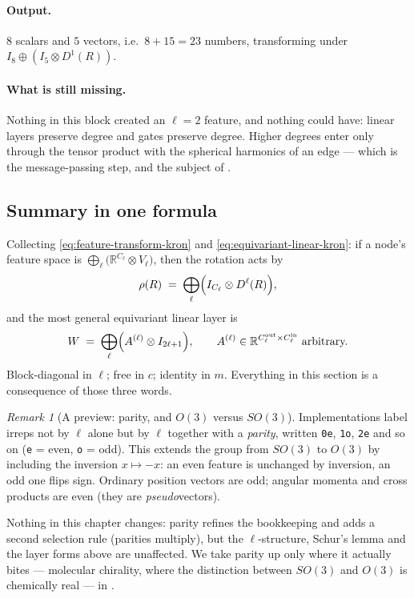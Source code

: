 \documentclass[11pt,a4paper]{report}
\theoremstyle{definition}
\theoremstyle{remark}
\newtheorem{remark}[remark]{Remark}
\newcommand{\RR}{\mathbb R}
\begin{document}
\paragraph{Output.} $8$ scalars and $5$ vectors, i.e.\ $8+15=23$ numbers,
transforming under $I_8\oplus(I_5\otimes D^1(R))$.

\paragraph{What is still missing.} Nothing in this block created an $\ell=2$
feature, and nothing could have: linear layers preserve degree and gates
preserve degree. Higher degrees enter only through the tensor product with
the spherical harmonics of an edge --- which is the message-passing step, and
the subject of .

\subsection{Summary in one formula}
\label{sec:linear-summary}

Collecting \eqref{eq:feature-transform-kron} and
\eqref{eq:equivariant-linear-kron}: if a node's feature space is
$\bigoplus_\ell\bigl(\RR^{C_\ell}\otimes V_\ell\bigr)$, then the rotation
acts by
\[
\rho(R) \;=\; \bigoplus_{\ell}\Bigl(I_{C_\ell}\otimes D^\ell(R)\Bigr),
\]
and the most general equivariant linear layer is
\[
W \;=\; \bigoplus_{\ell}\Bigl(A^{(\ell)}\otimes I_{2\ell+1}\Bigr),
\qquad A^{(\ell)}\in\RR^{C^{\mathrm{out}}_\ell\times C^{\mathrm{in}}_\ell}\ \text{arbitrary.}
\]
Block-diagonal in $\ell$; free in $c$; identity in $m$. Everything in this
section is a consequence of those three words.

\begin{remark}[A preview: parity, and $O(3)$ versus $SO(3)$]
\label{rem:parity-preview}
Implementations label irreps not by $\ell$ alone but by $\ell$ together with
a \emph{parity}, written \texttt{0e}, \texttt{1o}, \texttt{2e} and so on
(\texttt{e} = even, \texttt{o} = odd). This extends the group from $SO(3)$
to $O(3)$ by including the inversion $x\mapsto-x$: an even feature is
unchanged by inversion, an odd one flips sign. Ordinary position vectors are
odd; angular momenta and cross products are even (they are
\emph{pseudo}vectors).

Nothing in this chapter changes: parity refines the bookkeeping and adds a
second selection rule (parities multiply), but the $\ell$-structure,
Schur's lemma and the layer forms above are unaffected. We take parity up
only where it actually bites --- molecular chirality, where the distinction
between $SO(3)$ and $O(3)$ is chemically real --- in
.
\end{remark}
\end{document}
